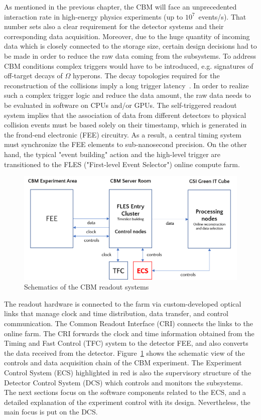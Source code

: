 
As mentioned in the previous chapter, the \gls{CBM} will face an unprecedented interaction rate in high-energy physics experiments (up to $10^{7}$~events/s). That number sets also a clear requirement for the detector systems and their corresponding data acquisition. Moreover, due to the huge quantity of incoming data which is closely connected to the storage size, certain design decisions had to be made in order to reduce the raw data coming from the subsystems. To address \gls{CBM} conditions complex triggers would have to be introduced, e.g. signatures of off-target decays of $\Omega$ hyperons. The decay topologies required for the reconstruction of the collisions imply a long trigger latency~\cite{Friese_2017}. In order to realize such a complex trigger logic and reduce the data amount, the raw data needs to be evaluated in software on \glspl{CPU} and/or \glspl{GPU}. The self-triggered readout system implies that the association of data from different detectors to physical collision events must be based solely on their timestamp, which is generated in the frond-end electronic (\gls{FEE}) circuitry. As a result, a central timing system must synchronize the \gls{FEE} elements to sub-nanosecond precision. On the other hand, the typical "event building" action and the high-level trigger are transitioned to the \gls{FLES} ("First-level Event Selector") online compute farm. 

\begin{figure}[!h]
\centering
\includegraphics[width=0.8\columnwidth]{Chapter3/Controls/images/online.png}
\caption{Schematics of the CBM readout systems}
\label{fig_controls}
\end{figure}

The readout hardware is connected to the farm via custom-developed optical links that manage clock and time distribution, data transfer, and control communication. The Common Readout Interface (\gls{CRI}) connects the links to the online farm. The CRI forwards the clock and time information obtained from the Timing and Fast Control (\gls{TFC}) system to the detector \gls{FEE}, and also converts the data received from the detector. Figure~\ref{fig_controls} shows the schematic view of the controls and data acquisition chain of the \gls{CBM} experiment. The Experiment Control System (\gls{ECS}) highlighted in red is also the supervisory structure of the Detector Control System (\gls{DCS}) which controls and monitors the subsystems. The next sections focus on the software components related to the \gls{ECS}, and a detailed explanation of the experiment control with its design. Nevertheless, the main focus is put on the \gls{DCS}.
